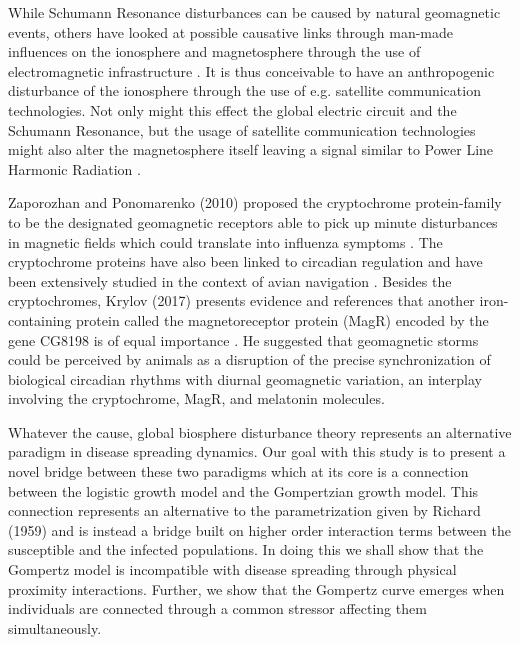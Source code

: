 \documentclass{article}
\begin{document}
While Schumann Resonance disturbances can be caused by natural geomagnetic events, others have looked at possible causative links through man-made influences on the ionosphere and magnetosphere through the use of electromagnetic infrastructure \cite{siingh2005review}. It is thus conceivable to have an anthropogenic disturbance of the ionosphere through the use of e.g. satellite communication technologies. Not only might this effect the
global electric circuit \cite{rycroft2008overview} and the Schumann Resonance, but the usage of satellite communication technologies might also alter the magnetosphere itself leaving a signal similar to Power Line Harmonic Radiation \cite{bullough2017power}.

Zaporozhan and Ponomarenko (2010) proposed the cryptochrome protein-family to be the designated geomagnetic receptors able to pick up minute disturbances in magnetic fields which could translate into influenza symptoms \cite{zaporozhan2010mechanisms}. The cryptochrome proteins have also been linked to circadian regulation \cite{rodgers2009chemical} and have been extensively studied in the context of avian navigation \cite{engels2014anthropogenic,
hiscock2016quantum}. Besides the cryptochromes, Krylov (2017) presents evidence and references that another iron-containing protein called the magnetoreceptor protein (MagR) encoded by the gene CG8198 is of equal importance \cite{krylov2017biological}. He suggested that geomagnetic storms could be perceived by animals as a disruption of the precise synchronization of biological circadian rhythms with diurnal geomagnetic variation, an interplay involving the cryptochrome, MagR, and melatonin molecules.

Whatever the cause, global biosphere disturbance theory represents an alternative paradigm in disease spreading dynamics. Our goal with this study is to present a novel bridge between these two paradigms which at its core is a connection between the logistic growth model and the Gompertzian growth model. This connection represents an alternative to the parametrization given by Richard (1959) \cite{richards1959flexible} and is instead a bridge built on higher order interaction terms between the susceptible and the infected populations. In doing this we shall show that the Gompertz model is incompatible with disease spreading through physical proximity interactions. Further, we show that the Gompertz curve emerges when individuals are connected through a common stressor affecting them simultaneously.
\end{document}
